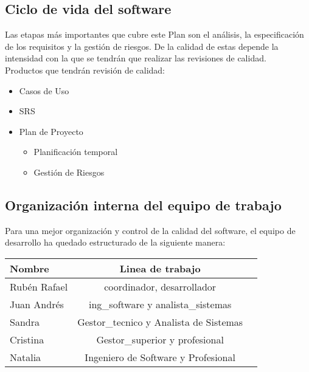 \documentclass[11pt, a4paper, twoside, titlepage]{article}
\begin{document}
		\subsection{Ciclo de vida del software} %
			Las etapas más importantes que cubre este Plan son el análisis, la especificación de los requisitos y la gestión de riesgos. De la calidad de estas depende la intensidad con la que se tendrán que realizar las revisiones de calidad. \\
			Productos que tendrán revisión de calidad: \\
				\begin{itemize}
					\item Casos de Uso
					\item SRS
					\item Plan de Proyecto
						\begin{itemize}
							\item Planificación temporal
							\item Gestión de Riesgos
						\end{itemize}
				\end{itemize}
				
		\subsection{Organización interna del equipo de trabajo}
		
			
			Para una mejor organización y control de la calidad del software, el equipo de desarrollo ha quedado estructurado de la siguiente manera:
			
			\begin{center}
				\begin{tabular}{|l |c |r|}
				\hline
				\textbf{Nombre} & \textbf{Linea de trabajo}\\
				\hline
				Rubén Rafael & \gls{coordinador}, \gls{desarrollador}\\
				\hline
				Juan Andrés & \gls{ing_software} y \gls{analista_sistemas}\\
				\hline
				Sandra & \gls{Gestor_tecnico} y Analista de Sistemas\\
				\hline
				Cristina & \gls{Gestor_superior} y \gls{profesional}\\
				\hline
				Natalia & Ingeniero de Software y Profesional\\
				\hline
				\end{tabular}
			\end{center}
			
\end{document}
